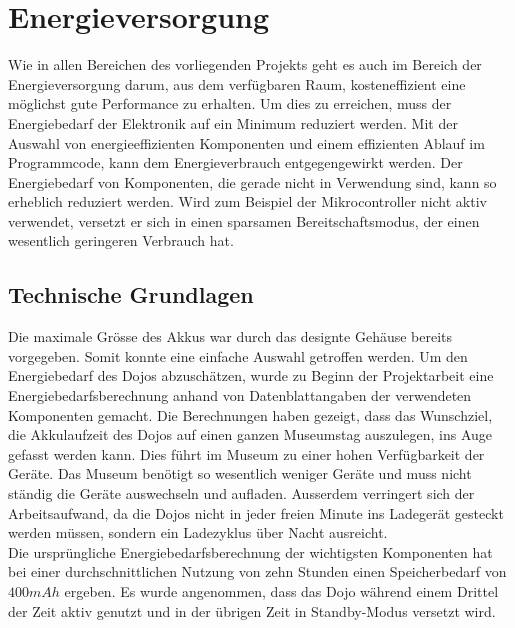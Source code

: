 \chapter{Energieversorgung}
\label{Energieversorgung}
\thispagestyle{fancy} 

Wie in allen Bereichen des vorliegenden Projekts geht es auch im Bereich der Energieversorgung darum, aus dem verfügbaren Raum, kosteneffizient eine möglichst gute Performance zu erhalten. Um dies zu erreichen, muss der Energiebedarf der Elektronik auf ein Minimum reduziert werden. Mit der Auswahl von energieeffizienten Komponenten und einem effizienten Ablauf im Programmcode, kann dem Energieverbrauch entgegengewirkt werden. Der Energiebedarf von Komponenten, die gerade nicht in Verwendung sind, kann so erheblich reduziert werden. Wird zum Beispiel der Mikrocontroller nicht aktiv verwendet, versetzt er sich in einen sparsamen Bereitschaftsmodus, der einen wesentlich geringeren Verbrauch hat.

\section{Technische Grundlagen}
 
Die maximale Grösse des Akkus war durch das designte Gehäuse bereits vorgegeben. Somit konnte eine einfache Auswahl getroffen werden. Um den Energiebedarf des Dojos abzuschätzen, wurde zu Beginn der Projektarbeit eine Energiebedarfsberechnung anhand von Datenblattangaben der verwendeten Komponenten gemacht. Die Berechnungen haben gezeigt, dass das Wunschziel, die Akkulaufzeit des Dojos auf einen ganzen Museumstag auszulegen, ins Auge gefasst werden kann. Dies führt im Museum zu einer hohen Verfügbarkeit der Geräte.  Das Museum benötigt so wesentlich weniger Geräte und muss nicht ständig die Geräte auswechseln und aufladen. Ausserdem verringert sich der Arbeitsaufwand, da die Dojos nicht in jeder freien Minute ins Ladegerät gesteckt werden müssen, sondern ein Ladezyklus über Nacht ausreicht.\\

Die ursprüngliche Energiebedarfsberechnung der wichtigsten Komponenten hat bei einer durchschnittlichen Nutzung von zehn Stunden einen Speicherbedarf von $400mAh$ ergeben. Es wurde angenommen, dass das Dojo während einem Drittel der Zeit aktiv genutzt und in der übrigen Zeit in Standby-Modus versetzt wird.\\ 

